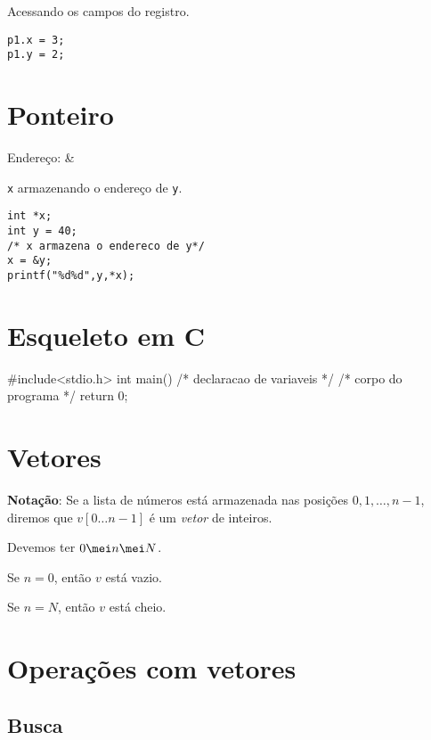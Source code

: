 \documentclass[a4paper]{memoir}
\newcommand{\nv}{0 \ldots n-1}
\begin{document}
\begin{ex}
Acessando os campos do registro.

\begin{verbatim}
p1.x = 3;
p1.y = 2;
\end{verbatim}

\end{ex}

\section{Ponteiro}

Endereço: \&

\begin{ex}
\verb|x| armazenando o endereço de \verb|y|.

\begin{verbatim}
int *x;
int y = 40;
/* x armazena o endereco de y*/
x = &y;
printf("%d%d",y,*x);
\end{verbatim}

\end{ex}

\section{Esqueleto em C}

\begin{ccode}
#include<stdio.h>
int main(){
  /* declaracao de variaveis */
  /* corpo do programa */
  return 0;
}
\end{ccode}

\section{Vetores}

\textbf{Notação}: Se a lista de números está armazenada nas posições $0,1,\ldots,n-1$, diremos que $v[\nv]$ é um \emph{vetor} de inteiros.

Devemos ter $0 \mei n \mei N$.

Se $n = 0$, então $v$ está vazio.

Se $n = N$, então $v$ está cheio.

\section{Operações com vetores}

\subsection{Busca}
\end{document}
